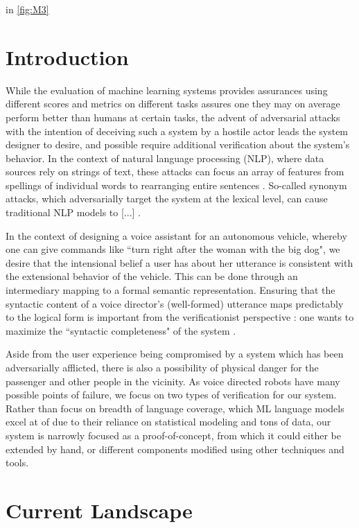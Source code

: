 \documentclass[a4paper, 11pt]{article}
\begin{document}
in \autoref{fig:M3}

\section{Introduction}

While the evaluation of machine learning systems provides assurances using
different scores and metrics on different tasks assures one they may on average
perform better than humans at certain tasks, the advent of adversarial attacks
\cite{szegedy} with the intention of deceiving such a system by a hostile actor
leads the system designer to desire, and possible require additional
verification about the system's behavior. In the context of natural language
processing (NLP), where data sources rely on strings of text, these attacks can
focus an array of features from spellings of individual words to rearranging
entire sentences \cite{}. So-called synonym attacks, which adversarially target
the system at the lexical level, can cause traditional NLP models to [...]
\cite{}.

In the context of designing a voice assistant for an autonomous vehicle, whereby
one can give commands like ``turn right after the woman with the big dog",
we desire that the intensional belief a user has about her utterance is
consistent with the extensional behavior of the vehicle. This can be done
through an intermediary mapping to a formal semantic representation. Ensuring
that the syntactic content of a voice director's (well-formed) utterance maps predictably to
the logical form is important from the verificationist perspective : one wants
to maximize the ``syntactic completeness" of the system \cite{macmillan2021}.

Aside from the user experience being compromised by a system which has been
adversarially afflicted, there is also a possibility of physical danger for the
passenger and other people in the vicinity. As voice directed robots have many
possible points of failure, we focus on two types of verification for our
system. Rather than focus on breadth of language coverage, which ML language
models excel at of due to their reliance on statistical modeling and tons
of data, our system is narrowly focused as a proof-of-concept, from which it
could either be extended by hand, or different components modified using
other techniques and tools.

\section{Current Landscape} 
\end{document}
